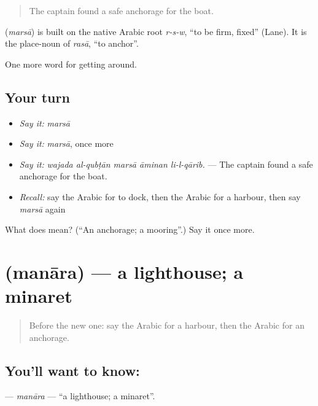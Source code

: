 \begin{quote}
The captain found a safe anchorage for the boat.
\end{quote}

\begin{cousinweb}
\textbf{} (\emph{marsā}) is built on the native Arabic root \emph{r-s-w}, \textquotedblleft{}to be firm, fixed\textquotedblright{} (Lane). It is the place-noun of \emph{rasā}, \textquotedblleft{}to anchor\textquotedblright{}.
\end{cousinweb}

\begin{grammarlens}[title={What you've built}]
One more word for getting around.
\end{grammarlens}

\subsection*{Your turn}
\begin{itemize}
\raggedright
  \item \emph{Say it:} \emph{marsā}
  \item \emph{Say it:} \emph{marsā}, once more
  \item \emph{Say it:} \emph{wajada al-qubṭān marsā āminan li-l-qārib.} — The captain found a safe anchorage for the boat.
  \item \emph{Recall:} say the Arabic for to dock, then the Arabic for a harbour, then say \emph{marsā} again
\end{itemize}

\begin{tcolorbox}[breakable,colback=teal!4,colframe=teal!35!black,title={Before you move on}]
What does  mean? (\textquotedblleft{}An anchorage; a mooring\textquotedblright{}.) Say it once more.
\end{tcolorbox}
\section[\texorpdfstring{\ar{منارة} (manāra)}{منارة (manāra)}]{ (manāra) — a lighthouse; a minaret}

\label{lesson:AR-C430-manara}



\begin{quote}
Before the new one: say the Arabic for a harbour, then the Arabic for an anchorage.
\end{quote}

\subsection*{You'll want to know: }
\textbf{} — \emph{manāra} — \textquotedblleft{}a lighthouse; a minaret\textquotedblright{}.

